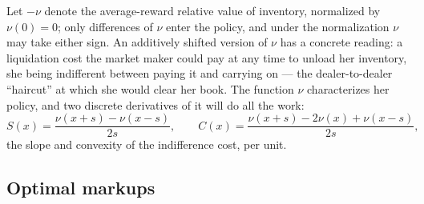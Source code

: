 \documentclass[11pt]{article}
\begin{document}
Let $-\nu$ denote the average-reward relative value of inventory, normalized by $\nu(0) = 0$; only differences of $\nu$ enter the policy, and under the normalization $\nu$ may take either sign. An additively shifted version of $\nu$ has a concrete reading: a liquidation cost the market maker could pay at any time to unload her inventory, she being indifferent between paying it and carrying on --- the dealer-to-dealer ``haircut'' at which she would clear her book. The function $\nu$ characterizes her policy, and two discrete derivatives of it will do all the work:
\[
S(x) = \frac{\nu(x+s) - \nu(x-s)}{2s}, \qquad
C(x) = \frac{\nu(x+s) - 2\nu(x) + \nu(x-s)}{2s},
\]
the slope and convexity of the indifference cost, per unit.

\subsection{Optimal markups}\label{sec:markup}
\end{document}
